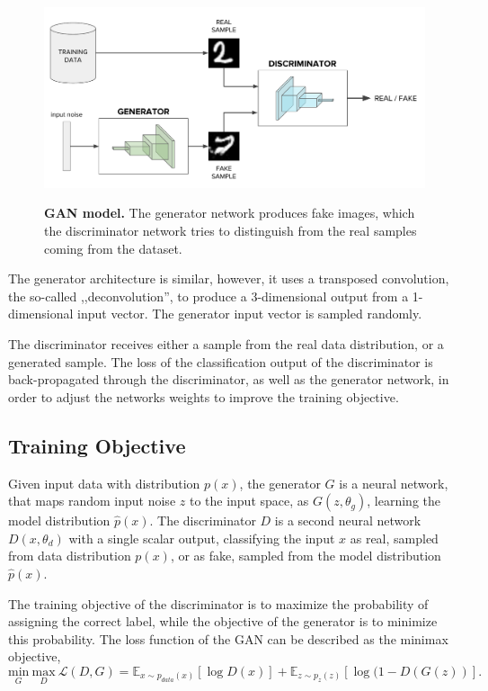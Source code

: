 \documentclass[12pt]{report}
\begin{document}
\begin{figure}[h]
\centering
{\includegraphics[width=\linewidth]{02_background/gan_model}}
\caption{\label{fig:gan} \textbf{GAN model.} The generator network produces fake images, which the discriminator network tries to distinguish from the real samples coming from the dataset.}
\end{figure}

The generator architecture is similar, however, it uses a transposed convolution, the so-called ,,deconvolution'', to produce a 3-dimensional output from a 1-dimensional input vector. The generator input vector is sampled randomly.

The discriminator receives either a sample from the real data distribution, or a generated sample. The loss of the classification output of the discriminator is back-propagated  through the discriminator, as well as the generator network, in order to adjust the networks weights to improve the training objective.

\subsection{Training Objective} \label{sec:GAN_training}

Given input data with distribution $p(x)$, the generator $G$ is a neural network, that maps random input noise $z$ to the input space, as $G(z, \theta_{g})$, learning the model distribution $\hat{p}(x)$. The discriminator $D$ is a second neural network $D(x, \theta_{d})$ with a single scalar output, classifying the input $x$ as real, sampled from data distribution $p(x)$, or as fake, sampled from the model distribution $\hat{p}(x)$. 

The training objective of the discriminator is to maximize the probability of assigning the correct label, while the objective of the generator is to minimize this probability. The loss function of the GAN can be described as the minimax objective,
\begin{equation}
\underset{G}{\mathrm{min}} \ \underset{D}{\mathrm{max}} \ \mathcal{L}(D,G) = \mathbb{E}_{x \sim p_{data}(x)}[\log D(x)] + \mathbb{E}_{z \sim p_{z}(z)}[\log (1 - D(G(z))].
\label{eq:minimax}
\end{equation}
\end{document}

